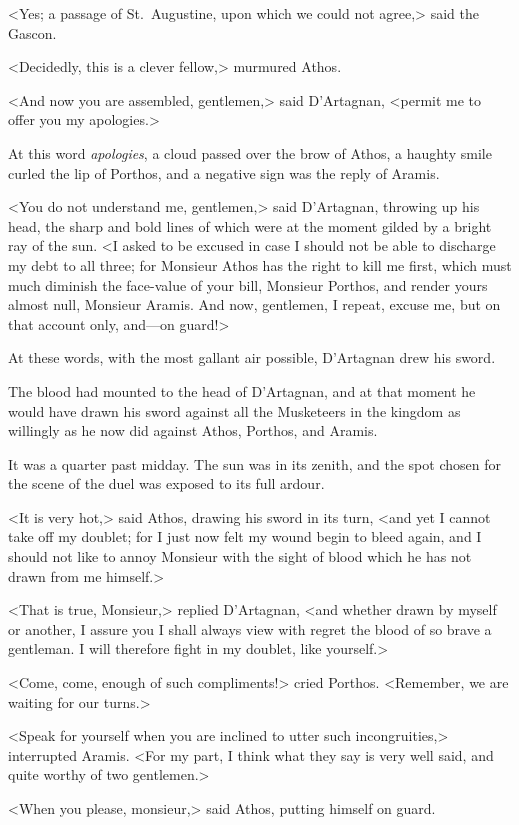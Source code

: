 <Yes; a passage of St.~Augustine, upon which we could not agree,> said the Gascon. 

<Decidedly, this is a clever fellow,> murmured Athos. 

<And now you are assembled, gentlemen,> said D'Artagnan, <permit me to offer you my apologies.> 

At this word \emph{apologies}, a cloud passed over the brow of Athos, a haughty smile curled the lip of Porthos, and a negative sign was the reply of Aramis. 

<You do not understand me, gentlemen,> said D'Artagnan, throwing up his head, the sharp and bold lines of which were at the moment gilded by a bright ray of the sun. <I asked to be excused in case I should not be able to discharge my debt to all three; for Monsieur Athos has the right to kill me first, which must much diminish the face-value of your bill, Monsieur Porthos, and render yours almost null, Monsieur Aramis. And now, gentlemen, I repeat, excuse me, but on that account only, and—on guard!> 

At these words, with the most gallant air possible, D'Artagnan drew his sword. 

The blood had mounted to the head of D'Artagnan, and at that moment he would have drawn his sword against all the Musketeers in the kingdom as willingly as he now did against Athos, Porthos, and Aramis. 

It was a quarter past midday. The sun was in its zenith, and the spot chosen for the scene of the duel was exposed to its full ardour. 

<It is very hot,> said Athos, drawing his sword in its turn, <and yet I cannot take off my doublet; for I just now felt my wound begin to bleed again, and I should not like to annoy Monsieur with the sight of blood which he has not drawn from me himself.> 

<That is true, Monsieur,> replied D'Artagnan, <and whether drawn by myself or another, I assure you I shall always view with regret the blood of so brave a gentleman. I will therefore fight in my doublet, like yourself.> 

<Come, come, enough of such compliments!> cried Porthos. <Remember, we are waiting for our turns.> 

<Speak for yourself when you are inclined to utter such incongruities,> interrupted Aramis. <For my part, I think what they say is very well said, and quite worthy of two gentlemen.> 

<When you please, monsieur,> said Athos, putting himself on guard. 

